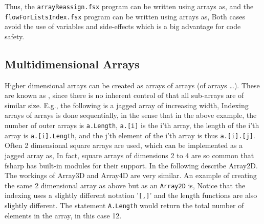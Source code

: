 Thus, the \texttt{arrayReassign.fsx} program can be written using arrays as,
and the \texttt{flowForListsIndex.fsx} program can be written using arrays as,
Both cases avoid the use of variables and side-effects which is a big advantage for code safety.

\subsection{Multidimensional Arrays}
Higher dimensional arrays can be created as arrays of arrays (of arrays \dots). These are known as , since there is no inherent control of that all sub-arrays are of similar size. E.g., the following is a jagged array of increasing width,
Indexing arrays of arrays is done sequentially, in the sense that in the above example, the number of outer arrays is \verb|a.Length|,  \verb|a.[i]| is the i'th array, the length of the i'th array is \verb|a.[i].Length|, and the j'th element of the i'th array is thus \verb|a.[i].[j]|. Often 2 dimensional square arrays are used, which can be implemented as a jagged array as,
In fact, square arrays of dimensions 2 to 4 are so common that fsharp has built-in modules for their support. In the following describe Array2D. The workings of Array3D and Array4D are very similar. An example of creating the same 2 dimensional array as above but as an \texttt{Array2D} is,
Notice that the indexing uses a slightly different notation '\verb|[,]|' and the length functions are also slightly different. The statement \verb|A.Length| would return the total number of elements in the array, in this case 12.


